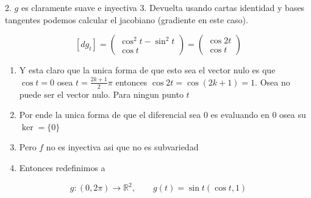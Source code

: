 \begin{bookproof}{}
2. $g$ es claramente suave e inyectiva 3. Devuelta usando cartas identidad y bases tangentes podemos calcular el jacobiano (gradiente en este caso).

\[
[dg_{t}]=\begin{pmatrix}\cos^{2}t-\sin^{2}t\\\cos t\end{pmatrix}=\begin{pmatrix}\cos2t\\ \cos t\end{pmatrix}
\]
\begin{enumerate}[start=4]
\item Y esta claro que la unica forma de que esto sea el vector nulo es que $\cos t=0$ osea $t=\frac{2k+1}{2}\pi$ entonces $\cos 2t=\cos(2k+1)=1$. Osea no puede ser el vector nulo. Para ningun punto $t$
\item Por ende la unica forma de que el diferencial sea $0$ es evaluando en $0$ osea su $\ker = \{ 0 \}$
\item Pero $f$ no es inyectiva asi que no es subvariedad
\item Entonces redefinimos a
\end{enumerate}
\[
g:(0,2\pi)\to\mathbb R^2, \qquad g(t)=\sin t\left(\cos t,1\right)
\]




\end{bookproof}
